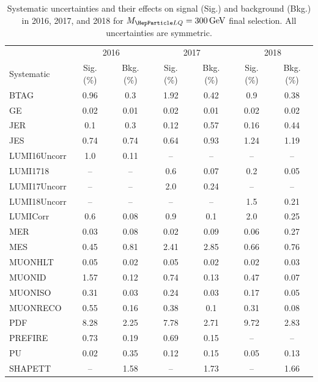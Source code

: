 \begin{table}[H]
	\begin{center}
        \begin{footnotesize}
			\caption{Systematic uncertainties and their effects on signal (Sig.) and background (Bkg.) in 2016, 2017, and 2018 for $\MLQ = \SI{300}{GeV}$ final selection. All uncertainties are symmetric.}
			\begin{tabular}{lcccccc} \hline \hline
				& \multicolumn{2}{c}{2016} & \multicolumn{2}{c}{2017} & \multicolumn{2}{c}{2018} \\
				Systematic & Sig. (\%) & Bkg. (\%) & Sig. (\%) & Bkg. (\%) & Sig. (\%) & Bkg. (\%) \\ \hline
				BTAG &  0.96  &  0.3 &  1.92  &  0.42 &  0.9  &  0.38 \\
				GE &  0.02  &  0.01 &  0.02  &  0.01 &  0.02  &  0.02 \\
				JER &  0.1  &  0.3 &  0.12  &  0.57 &  0.16  &  0.44 \\
				JES &  0.74  &  0.74 &  0.64  &  0.93 &  1.24  &  1.19 \\
				LUMI16Uncorr &  1.0  &  0.11 & -- & -- & -- & -- \\
				LUMI1718 & -- & -- &  0.6  &  0.07 &  0.2  &  0.05 \\
				LUMI17Uncorr & -- & -- &  2.0  &  0.24 & -- & -- \\
				LUMI18Uncorr & -- & -- & -- & -- &  1.5  &  0.21 \\
				LUMICorr &  0.6  &  0.08 &  0.9  &  0.1 &  2.0  &  0.25 \\
				MER &  0.03  &  0.08 &  0.02  &  0.09 &  0.06  &  0.27 \\
				MES &  0.45  &  0.81 &  2.41  &  2.85 &  0.66  &  0.76 \\
				MUONHLT &  0.05  &  0.02 &  0.05  &  0.02 &  0.02  &  0.03 \\
				MUONID &  1.57  &  0.12 &  0.74  &  0.13 &  0.47  &  0.07 \\
				MUONISO &  0.31  &  0.03 &  0.24  &  0.03 &  0.17  &  0.05 \\
				MUONRECO &  0.55  &  0.16 &  0.38  &  0.1 &  0.31  &  0.08 \\
				PDF &  8.28  &  2.25 &  7.78  &  2.71 &  9.72  &  2.83 \\
				PREFIRE &  0.73  &  0.19 &  0.69  &  0.15 & -- & -- \\
				PU &  0.02  &  0.35 &  0.12  &  0.15 &  0.05  &  0.13 \\
				SHAPETT & -- &  1.58 & -- &  1.73 & -- &  1.66 \\

\end{tabular}
\end{footnotesize}
\end{center}
\end{table}
